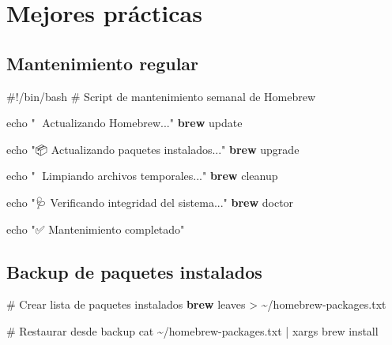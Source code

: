 \documentclass[
  11pt,
  letterpaper,
  oneside,
  openany]{scrbook}
\newenvironment{Shaded}{}{}
\newcommand{\BuiltInTok}[1]{\textcolor[rgb]{0.84,0.23,0.29}{#1}}
\newcommand{\CommentTok}[1]{\textcolor[rgb]{0.42,0.45,0.49}{#1}}
\newcommand{\ExtensionTok}[1]{\textcolor[rgb]{0.84,0.23,0.29}{\textbf{#1}}}
\newcommand{\FunctionTok}[1]{\textcolor[rgb]{0.44,0.26,0.76}{#1}}
\newcommand{\KeywordTok}[1]{\textcolor[rgb]{0.84,0.23,0.29}{#1}}
\newcommand{\NormalTok}[1]{\textcolor[rgb]{0.14,0.16,0.18}{#1}}
\newcommand{\OperatorTok}[1]{\textcolor[rgb]{0.14,0.16,0.18}{#1}}
\newcommand{\StringTok}[1]{\textcolor[rgb]{0.01,0.18,0.38}{#1}}
\newcommand{\VariableTok}[1]{\textcolor[rgb]{0.89,0.38,0.04}{#1}}
\begin{document}
\begin{Shaded}
\end{Shaded}

\section{Mejores prácticas}\label{mejores-pruxe1cticas-2}

\subsection{Mantenimiento regular}\label{mantenimiento-regular}

\begin{Shaded}
\begin{Highlighting}[]
\CommentTok{\#!/bin/bash}
\CommentTok{\# Script de mantenimiento semanal de Homebrew}

\BuiltInTok{echo} \StringTok{"🔄 Actualizando Homebrew..."}
\ExtensionTok{brew}\NormalTok{ update}

\BuiltInTok{echo} \StringTok{"📦 Actualizando paquetes instalados..."}
\ExtensionTok{brew}\NormalTok{ upgrade}

\BuiltInTok{echo} \StringTok{"🧹 Limpiando archivos temporales..."}
\ExtensionTok{brew}\NormalTok{ cleanup}

\BuiltInTok{echo} \StringTok{"🩺 Verificando integridad del sistema..."}
\ExtensionTok{brew}\NormalTok{ doctor}

\BuiltInTok{echo} \StringTok{"✅ Mantenimiento completado"}
\end{Highlighting}
\end{Shaded}

\subsection{Backup de paquetes
instalados}\label{backup-de-paquetes-instalados}

\begin{Shaded}
\begin{Highlighting}[]
\CommentTok{\# Crear lista de paquetes instalados}
\ExtensionTok{brew}\NormalTok{ leaves }\OperatorTok{\textgreater{}}\NormalTok{ \textasciitilde{}/homebrew{-}packages.txt}

\CommentTok{\# Restaurar desde backup}
\FunctionTok{cat}\NormalTok{ \textasciitilde{}/homebrew{-}packages.txt }\KeywordTok{|} \FunctionTok{xargs}\NormalTok{ brew install}
\end{Highlighting}
\end{Shaded}
\end{document}
